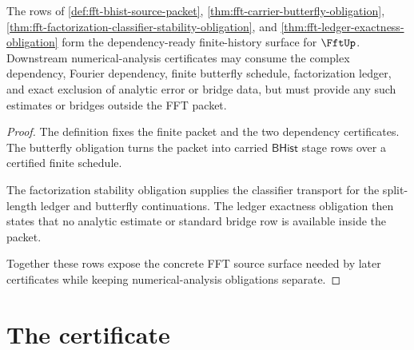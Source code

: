 \begin{theorem}
\label{thm:fft-root-threshold-unblock-surface}
The rows of \autoref{def:fft-bhist-source-packet},
\autoref{thm:fft-carrier-butterfly-obligation},
\autoref{thm:fft-factorization-classifier-stability-obligation}, and
\autoref{thm:fft-ledger-exactness-obligation} form the dependency-ready
finite-history surface for $\FftUp$. Downstream numerical-analysis
certificates may consume the complex dependency, Fourier dependency, finite
butterfly schedule, factorization ledger, and exact exclusion of analytic
error or bridge data, but must provide any such estimates or bridges outside
the FFT packet.
\end{theorem}
\begin{proof}
The definition fixes the finite packet and the two dependency certificates.
The butterfly obligation turns the packet into carried $\mathsf{BHist}$ stage
rows over a certified finite schedule.

The factorization stability obligation supplies the classifier transport for
the split-length ledger and butterfly continuations. The ledger exactness
obligation then states that no analytic estimate or standard bridge row is
available inside the packet.

Together these rows expose the concrete FFT source surface needed by later
certificates while keeping numerical-analysis obligations separate.
\end{proof}

\section{The certificate}
\label{sec:fft-certificate}

